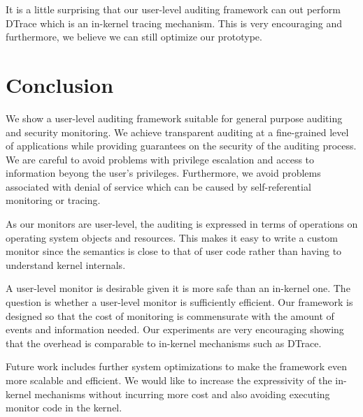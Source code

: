 It is a little surprising that our user-level auditing framework
can out perform DTrace which is an in-kernel tracing mechanism.
This is very encouraging and furthermore, 
we believe we can still optimize our prototype.

\section{Conclusion}

We show a user-level auditing framework suitable for general purpose
auditing and security monitoring. 
We achieve transparent auditing
at a fine-grained level of applications while providing guarantees
on the security of the auditing process. We are careful to avoid problems
with privilege escalation and access to information beyong the user's
privileges. Furthermore, we avoid problems associated with denial of
service which can be caused by self-referential monitoring or tracing.

As our monitors are user-level, the auditing is expressed in terms
of operations on operating system objects and resources. This makes it
easy to write a custom monitor since the semantics is close to that
of user code rather than having to understand kernel internals.

A user-level monitor is desirable given it is more safe than an in-kernel one.
The question is whether a user-level monitor is sufficiently efficient. 
Our framework is designed so that the cost of monitoring
is commensurate with the amount of events and information needed.
Our experiments are very encouraging 
showing that the overhead is comparable to in-kernel 
mechanisms such as DTrace.

Future work includes further system optimizations to make the framework
even more scalable and efficient. We would like to increase the
expressivity of the in-kernel mechanisms without incurring more cost
and also avoiding executing monitor code in the kernel.

